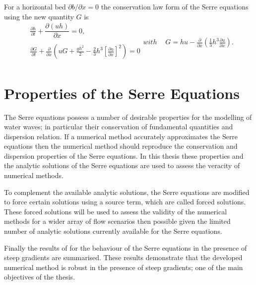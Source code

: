 For a horizontal bed $\partial b / \partial x = 0$ the conservation law form of the Serre equations using the new quantity $G$ is
\begin{subequations}
	\label{eqn:FullSerreConHorizBed}
	\begin{align}
	&\frac{\partial h}{\partial t} + \dfrac{\partial (uh)}{\partial x} = 0, \label{eqn:FullSerreConMassHorizBed} \\  \nonumber \\
	&\frac{\partial G}{\partial t}   + \frac{\partial}{\partial x} \left( {u} G + \frac{gh^2}{2} - \frac{2}{3}h^3 \left[\frac{\partial {u}}{\partial x}\right]^2 \right) = 0 \label{eqn:SerreconsconmomHorizBed}\\ \nonumber 
	\end{align}
	with
	\begin{align}
	&G =  h {u}  - \frac{\partial}{\partial x}\left(\frac{1}{3}h^3  \frac{\partial {u}}{\partial x}\right). \label{defn:SerreEqnConservedQuantity1HorizBed}
	\end{align}
\end{subequations}


\section{Properties of the Serre Equations}
The Serre equations possess a number of desirable properties for the modelling of water waves; in particular their conservation of fundamental quantities and dispersion relation. If a numerical method accurately approximates the Serre equations then the numerical method should reproduce the conservation and dispersion properties of the Serre equations. In this thesis these properties and the analytic solutions of the Serre equations are used to assess the veracity of numerical methods. 

To complement the available analytic solutions, the Serre equations are modified to force certain solutions using a source term, which are called forced solutions. These forced solutions will be used to assess the validity of the numerical methods for a wider array of flow scenarios then possible given the limited number of analytic solutions currently available for the Serre equations.

Finally the results of \citet{Pitt-2017-1725} for the behaviour of the Serre equations in the presence of steep gradients are summarised. These results demonstrate that the developed numerical method is robust in the presence of steep gradients; one of the main objectives of the thesis. 

